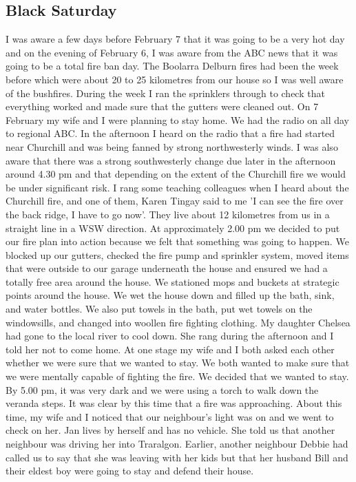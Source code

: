 \documentclass[a4paper]{article}
\begin{document}
    \subsection{Black Saturday}

        I was aware a few days before February 7 that it was going to be a very hot day and on the evening of February 6, I was aware from the ABC news that it was going to be a total fire ban day. The Boolarra Delburn fires had been the week before which were about 20 to 25 kilometres from our house so I was well aware of the bushfires.
        During the week I ran the sprinklers through to check that everything worked and made sure that the gutters were cleaned out.
        On 7 February my wife and I were planning to stay home. We had the radio on all day to regional ABC.
        In the afternoon I heard on the radio that a fire had started near Churchill and was being fanned by strong northwesterly winds. I was also aware that there was a strong southwesterly change due later in the afternoon around 4.30 pm and that depending on the extent of the Churchill fire we would be under significant risk.
        I rang some teaching colleagues when I heard about the Churchill fire, and one of them, Karen Tingay said to me 'I can see the fire over the back ridge, I have to go now'. They live about 12 kilometres from us in a straight line in a WSW direction.
        At approximately 2.00 pm we decided to put our fire plan into action because we felt that something was going to happen. We blocked up our gutters, checked the fire pump and sprinkler system, moved items that were outside to our garage underneath the house and ensured we had a totally free area around the house. We stationed mops and buckets at strategic points around the house. We wet the house down and filled up the bath, sink, and water bottles. We also put towels in the bath, put wet towels on the windowsills, and changed into woollen fire fighting clothing.
        My daughter Chelsea had gone to the local river to cool down. She rang during the afternoon and I told her not to come home.
        At one stage my wife and I both asked each other whether we were sure that we wanted to stay. We both wanted to make sure that we were mentally capable of fighting the fire. We decided that we wanted to stay.
        By 5.00 pm, it was very dark and we were using a torch to walk down the veranda steps. It was clear by this time that a fire was approaching.
        About this time, my wife and I noticed that our neighbour's light was on and we went to check on her. Jan lives by herself and has no vehicle. She told us that another neighbour was driving her into Traralgon. Earlier, another neighbour Debbie had called us to say that she was leaving with her kids but that her husband Bill and their eldest boy were going to stay and defend their house.
\end{document}
